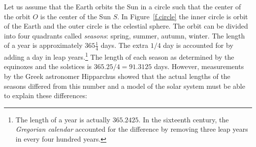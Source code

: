 Let us assume that the Earth orbits the Sun in a circle such that the center of the orbit $O$ is the center of the Sun $S$. In Figure~\ref{f.circle} the inner circle is orbit of the Earth and the outer circle is the celestial sphere. The orbit can be divided into four quadrants called \emph{seasons}: spring, summer, autumn, winter.
%
%
%
%
%
%
%
The length of a year is approximately $365 \frac{1}{4}$ days. The extra $1/4$ day is accounted for by adding a day in leap years.\footnote{The length of a year is actually $365.2425$. In the sixteenth century, the \emph{Gregorian calendar} accounted for the difference by removing three leap years in every four hundred years.} The length of each season as determined by the equinoxes and the solstices is $365.25/4=91.3125$ days. However, measurements by the Greek astronomer Hipparchus showed that the actual lengths of the seasons differed from this number and a model of the solar system must be able to explain these differences:
